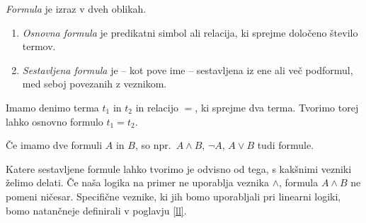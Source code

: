 \begin{definicija} \label{formula}
	\emph{Formula} je izraz v dveh oblikah.
	\begin{enumerate}
        \item \emph{Osnovna formula} je predikatni simbol ali relacija, ki sprejme določeno število termov.
        \item \emph{Sestavljena formula} je -- kot pove ime -- sestavljena iz ene ali več podformul, med seboj povezanih z veznikom.
	\end{enumerate}
\end{definicija}
\begin{primer*}
    Imamo denimo terma $t_1$ in $t_2$ in relacijo $=$, ki sprejme dva terma. Tvorimo torej lahko osnovno formulo $t_1=t_2$.
\end{primer*}
\begin{primer*}
    Če imamo dve formuli $A$ in $B$, so npr.\ $A \land B$, $\neg A$, $A \lor B$ tudi formule.
\end{primer*}
Katere sestavljene formule lahko tvorimo je odvisno od tega, s kakšnimi vezniki želimo delati. Če naša logika na primer ne uporablja veznika $\land$, formula $A \land B$ ne pomeni ničesar. Specifične veznike, ki jih bomo uporabljali pri linearni logiki, bomo natančneje definirali v poglavju \ref{ll}.
